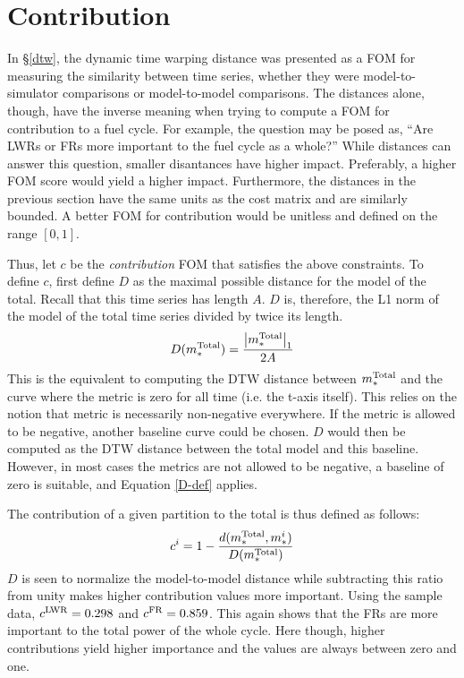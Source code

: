 \clearpage
\section{Contribution}
\label{contribution}

In \S\ref{dtw}, the dynamic time warping distance was presented as a 
FOM for measuring the similarity between time series, whether they 
were model-to-simulator comparisons or model-to-model comparisons.
The distances alone, though, have the inverse meaning when trying to 
compute a FOM for contribution to a fuel cycle.  For example, the 
question may be posed as, ``Are LWRs or FRs more important to the fuel 
cycle as a whole?'' While distances can answer this question, smaller 
disantances have higher impact. Preferably, a higher FOM score would yield a 
higher impact. Furthermore, the distances in the previous section have
the same units as the cost matrix and are similarly bounded. A better 
FOM for contribution would be unitless and defined on the range $[0,1]$.

Thus, let $c$ be the \emph{contribution} FOM that satisfies the above 
constraints. To define $c$, first define $D$ as the maximal possible 
distance for the model of the total. Recall that this time series has length $A$.
$D$ is, therefore, the L1 norm of the model of the total time series divided
by twice its length. 
\begin{equation}
\label{D-def}
D(m_*^{\mathrm{Total}}) = \frac{\left|m_*^{\mathrm{Total}}\right|_1}{2A}
\end{equation}
This is the equivalent to computing the DTW distance
between $m_*^{\mathrm{Total}}$ and the curve where the metric is zero for all time 
(i.e. the t-axis itself).  This relies on the notion that 
metric is necessarily non-negative everywhere.  If the metric is allowed to 
be negative, another baseline curve could be chosen. $D$ would then be 
computed as the DTW distance between the total model and this baseline.
However, in most cases the metrics are not allowed to be negative, 
a baseline of zero is suitable, and Equation \ref{D-def} applies.

The contribution of a given partition to the total is thus defined as follows:
\begin{equation}
\label{cont}
c^i = 1 - \frac{d(m_*^{\mathrm{Total}}, m_*^i)}{D(m_*^{\mathrm{Total}})}
\end{equation}
$D$ is seen to normalize the model-to-model distance while subtracting this
ratio from unity makes higher contribution values more important.  
Using the sample data, $c^{\mathrm{LWR}} = 0.298$ and $c^{\mathrm{FR}} = 0.859$. This again shows
that the FRs are more important to the total power of the whole cycle.
Here though, higher contributions yield higher importance and the values
are always between zero and one.

